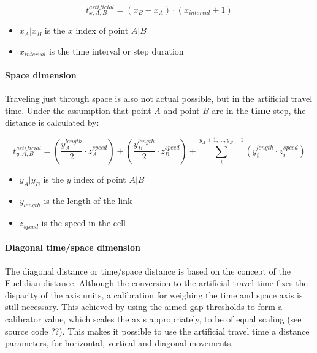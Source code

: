 \begin{equation}
	t_{x,A,B}^{artificial} = (x_B - x_A) \cdot ( x_{interval} + 1 )
	\label{equation_t_v_time}
\end{equation}

\begin{itemize}
	\setlength\itemsep{0.1em}	
	\item[] $x_A | x_B$ is the $x$ index of point $A | B$
	\item[] $x_{interval}$ is the time interval or step duration
\end{itemize}

\paragraph{Space dimension} Traveling just through space is also not actual possible, but in the artificial travel time. Under the assumption that point $A$ and point $B$ are in the \textbf{time} step, the distance is calculated by:  

\begin{equation}
	t_{y,A,B}^{artificial} = (\frac{y_{A}^{length}}{2}  \cdot z_{A}^{speed}) + (\frac{y_{B}^{length}}{2} \cdot z_{B}^{speed}) + \sum_{i}^{y_A + 1,...,y_B - 1} (y_{i}^{length} \cdot z_{i}^{speed})
\end{equation}

\begin{itemize}
	\setlength\itemsep{0.1em}	
	\item[] $y_A | y_B$ is the $y$ index of point $A | B$
	\item[] $y_{length}$ is the length of the link
	\item[] $z_{speed}$ is the speed in the cell
\end{itemize}

\paragraph{Diagonal time/space dimension} The diagonal distance or time/space distance is based on the concept of the Euclidian distance. Although the conversion to the artificial travel time fixes the disparity of the axis units, a calibration for weighing the time and space axis is still necessary. This achieved by using the aimed gap thresholds to form a calibrator value, which scales the axis appropriately, to be of equal scaling (see source code ??). This makes it possible to use the artificial travel time a distance parameters, for horizontal, vertical and diagonal movements.

